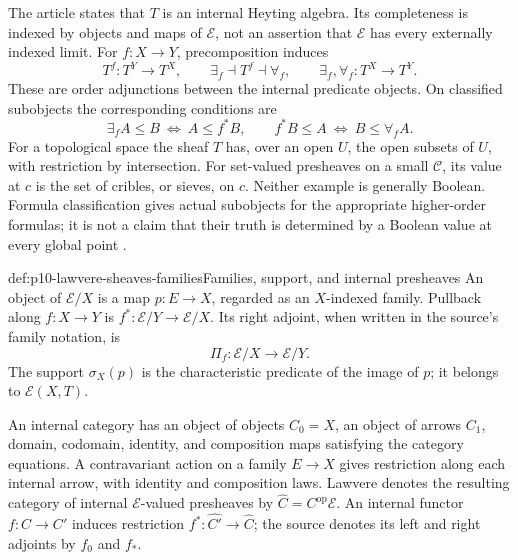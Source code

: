 The article states that \(T\) is an internal Heyting algebra.  Its
completeness is indexed by objects and maps of \(\mathcal E\), not an
assertion that \(\mathcal E\) has every externally indexed limit.  For
\(f:X\to Y\), precomposition induces
\[
 T^f:T^Y\longrightarrow T^X,
 \qquad \exists_f\dashv T^f\dashv\forall_f,
 \qquad \exists_f,\forall_f:T^X\longrightarrow T^Y.
\]
These are order adjunctions between the internal predicate objects.
On classified subobjects the corresponding conditions are
\[
 \exists_f A\leq B\ \Longleftrightarrow\ A\leq f^*B,
 \qquad f^*B\leq A\ \Longleftrightarrow\ B\leq\forall_f A.
\]
For a topological space the sheaf \(T\) has, over an open \(U\),
the open subsets of \(U\), with restriction by intersection.  For
set-valued presheaves on a small \(\mathcal C\), its value at \(c\)
is the set of cribles, or sieves, on \(c\).  Neither example is
generally Boolean.  Formula classification gives actual subobjects for
the appropriate higher-order formulas; it is not a claim that their
truth is determined by a Boolean value at every global point
\cite[p.~330]{Lawvere1970}.

\begin{hbdefinition}{def:p10-lawvere-sheaves-families}{Families, support, and internal presheaves}
An object of \(\mathcal E/X\) is a map \(p:E\to X\), regarded as
an \(X\)-indexed family.  Pullback along \(f:X\to Y\) is
\(f^*:\mathcal E/Y\to\mathcal E/X\).  Its right adjoint, when
written in the source's family notation, is
\[
 \Pi_f:\mathcal E/X\longrightarrow\mathcal E/Y.
\]
The support \(\sigma_X(p)\) is the characteristic predicate of the
image of \(p\); it belongs to \(\mathcal E(X,T)\).

An internal category has an object of objects \(C_0=X\), an object of
arrows \(C_1\), domain, codomain, identity, and composition maps
satisfying the category equations.  A contravariant action on a family
\(E\to X\) gives restriction along each internal arrow, with identity
and composition laws.  Lawvere denotes the resulting category of
internal \(\mathcal E\)-valued presheaves by
\(\widehat C=C^{\mathrm{op}}\mathcal E\).  An internal functor
\(f:C\to C'\) induces restriction
\(f^*:\widehat{C'}\to\widehat C\); the source denotes its
left and right adjoints by \(f_0\) and \(f_*\).
\end{hbdefinition}

